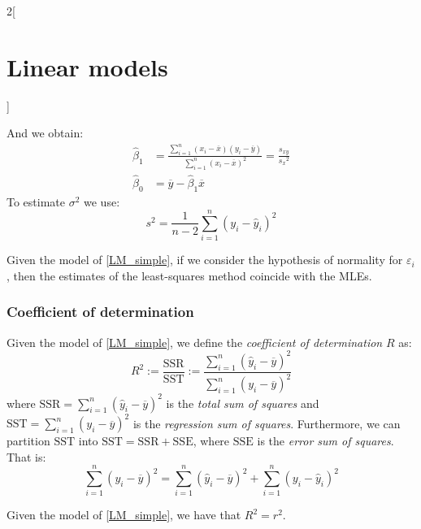 \documentclass[../../../main_math.tex]{subfiles}
\begin{document}
\begin{multicols}{2}[\section{Linear models}]
\begin{proposition}
    And we obtain:
    \begin{align*}
      \hat\beta_1 & =\frac{\sum_{i=1}^n(x_i-\overline{x})(y_i-\overline{y})}{\sum_{i=1}^n{(x_i-\overline{x})}^2}=\frac{s_{xy}}{{s_x}^2} \\
      \hat\beta_0 & =\overline{y}-\hat\beta_1\overline{x}
    \end{align*}
    To estimate $\sigma^2$ we use: $$s^2=\frac{1}{n-2}\sum_{i=1}^n{(y_i-\hat{y}_i)}^2$$
  \end{proposition}
  \begin{theorem}
    Given the model of \cref{LM_simple}, if we consider the hypothesis of normality for $\varepsilon_i$, then the estimates of the least-squares method coincide with the MLEs.
  \end{theorem}
  \subsubsection{Coefficient of determination}
  \begin{definition}
    Given the model of \cref{LM_simple}, we define the \emph{coefficient of determination} $R$ as:
    $$R^2:=\frac{\mathrm{SSR}}{\mathrm{SST}}:=\frac{\sum_{i=1}^n{(\hat{y}_i-\overline{y})}^2}{\sum_{i=1}^n{(y_i-\overline{y})}^2}$$ where $\mathrm{SSR}=\sum_{i=1}^n{(\hat{y}_i-\overline{y})}^2$ is the \emph{total sum of squares} and $\mathrm{SST}=\sum_{i=1}^n{(y_i-\overline{y})}^2$ is the \emph{regression sum of squares}. Furthermore, we can partition $\mathrm{SST}$ into $\mathrm{SST}=\mathrm{SSR}+\mathrm{SSE}$, where $\mathrm{SSE}$ is the \emph{error sum of squares}. That is: $$\sum_{i=1}^n{(y_i-\overline{y})}^2=\sum_{i=1}^n{(\hat{y}_i-\overline{y})}^2+\sum_{i=1}^n{(y_i-\hat{y}_i)}^2$$
  \end{definition}
  \begin{proposition}
    Given the model of \cref{LM_simple}, we have that $R^2=r^2$.
  \end{proposition}

\end{multicols}
\end{document}
